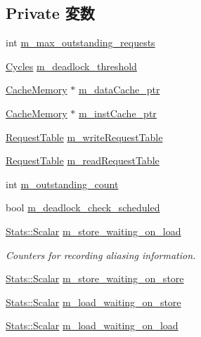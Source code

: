 \subsection*{Private 変数}
\begin{DoxyCompactItemize}
\item 
int \hyperlink{classSequencer_aa4e402fb0283ff3547ee82785e7a66c3}{m\_\-max\_\-outstanding\_\-requests}
\item 
\hyperlink{classCycles}{Cycles} \hyperlink{classSequencer_a4760ee57ee761ad53400a617eb12e95a}{m\_\-deadlock\_\-threshold}
\item 
\hyperlink{classCacheMemory}{CacheMemory} $\ast$ \hyperlink{classSequencer_a7a3b3fe88942aab5003a24c6f1da4428}{m\_\-dataCache\_\-ptr}
\item 
\hyperlink{classCacheMemory}{CacheMemory} $\ast$ \hyperlink{classSequencer_ad75cc69f67160a8550641442ffdb6a47}{m\_\-instCache\_\-ptr}
\item 
\hyperlink{classSequencer_ab8b07c7968ec41f243eeb0c53e459bb8}{RequestTable} \hyperlink{classSequencer_ad419eb325e663790853ec757ca3b02aa}{m\_\-writeRequestTable}
\item 
\hyperlink{classSequencer_ab8b07c7968ec41f243eeb0c53e459bb8}{RequestTable} \hyperlink{classSequencer_a50b1d01ac64e8f892be4a49998965cda}{m\_\-readRequestTable}
\item 
int \hyperlink{classSequencer_a5d645b1dc48106eac07688fc8c65edd2}{m\_\-outstanding\_\-count}
\item 
bool \hyperlink{classSequencer_a2e50c90663719c912c32881d58f1bd01}{m\_\-deadlock\_\-check\_\-scheduled}
\item 
\hyperlink{classStats_1_1Scalar}{Stats::Scalar} \hyperlink{classSequencer_a6d186a780be6aa79db648192dd730779}{m\_\-store\_\-waiting\_\-on\_\-load}
\begin{DoxyCompactList}\small\item\em Counters for recording aliasing information. \item\end{DoxyCompactList}\item 
\hyperlink{classStats_1_1Scalar}{Stats::Scalar} \hyperlink{classSequencer_a79cb8a27dd783e3c7298d8d874795b3d}{m\_\-store\_\-waiting\_\-on\_\-store}
\item 
\hyperlink{classStats_1_1Scalar}{Stats::Scalar} \hyperlink{classSequencer_a8e5427a5d38caa118425b87f68c8b8c0}{m\_\-load\_\-waiting\_\-on\_\-store}
\item 
\hyperlink{classStats_1_1Scalar}{Stats::Scalar} \hyperlink{classSequencer_a19936e24600f4fafad29833ae73051fa}{m\_\-load\_\-waiting\_\-on\_\-load}

\end{DoxyCompactItemize}

